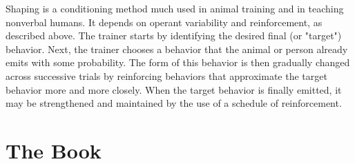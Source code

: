 \documentclass[11pt]{article}
\theoremstyle{remark}
\theoremstyle{definition}
\begin{document}






Shaping is a conditioning method much used in animal training and in teaching nonverbal humans. It depends on operant variability and reinforcement, as described above. The trainer starts by identifying the desired final (or "target") behavior. Next, the trainer chooses a behavior that the animal or person already emits with some probability. The form of this behavior is then gradually changed across successive trials by reinforcing behaviors that approximate the target behavior more and more closely. When the target behavior is finally emitted, it may be strengthened and maintained by the use of a schedule of reinforcement.














\section{The Book}


\end{document}

